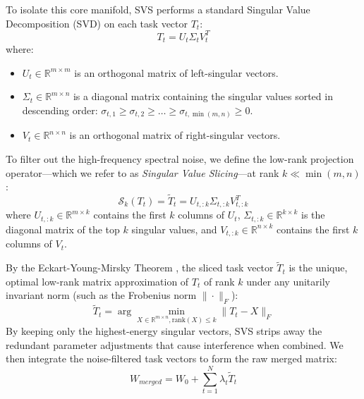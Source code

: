 To isolate this core manifold, SVS performs a standard Singular Value Decomposition (SVD) on each task vector $T_t$:
\begin{equation}
    T_t = U_t \Sigma_t V_t^T
\end{equation}
where:
\begin{itemize}
    \item $U_t \in \mathbb{R}^{m \times m}$ is an orthogonal matrix of left-singular vectors.
    \item $\Sigma_t \in \mathbb{R}^{m \times n}$ is a diagonal matrix containing the singular values sorted in descending order: $\sigma_{t, 1} \ge \sigma_{t, 2} \ge \dots \ge \sigma_{t, \min(m, n)} \ge 0$.
    \item $V_t \in \mathbb{R}^{n \times n}$ is an orthogonal matrix of right-singular vectors.
\end{itemize}

To filter out the high-frequency spectral noise, we define the low-rank projection operator—which we refer to as \emph{Singular Value Slicing}—at rank $k \ll \min(m, n)$:
\begin{equation}
    \mathcal{S}_k(T_t) = \tilde{T}_t = U_{t, :k} \Sigma_{t, :k} V_{t, :k}^T
\end{equation}
where $U_{t, :k} \in \mathbb{R}^{m \times k}$ contains the first $k$ columns of $U_t$, $\Sigma_{t, :k} \in \mathbb{R}^{k \times k}$ is the diagonal matrix of the top $k$ singular values, and $V_{t, :k} \in \mathbb{R}^{n \times k}$ contains the first $k$ columns of $V_t$.

By the Eckart-Young-Mirsky Theorem \cite{eckart1936approximation, mirsky1960symmetric}, the sliced task vector $\tilde{T}_t$ is the unique, optimal low-rank matrix approximation of $T_t$ of rank $k$ under any unitarily invariant norm (such as the Frobenius norm $\|\cdot\|_F$):
\begin{equation}
    \tilde{T}_t = \arg\min_{X \in \mathbb{R}^{m \times n}, \text{rank}(X) \le k} \|T_t - X\|_F
\end{equation}
By keeping only the highest-energy singular vectors, SVS strips away the redundant parameter adjustments that cause interference when combined. We then integrate the noise-filtered task vectors to form the raw merged matrix:
\begin{equation}
    W_{merged} = W_0 + \sum_{t=1}^N \lambda_t \tilde{T}_t
\end{equation}

